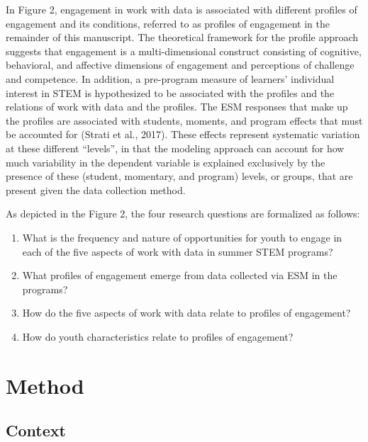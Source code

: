 \documentclass[]{book}
\providecommand{\tightlist}{%
  \setlength{\itemsep}{0pt}\setlength{\parskip}{0pt}}
\theoremstyle{definition}
\theoremstyle{definition}
\theoremstyle{definition}
\theoremstyle{remark}
\begin{document}
In Figure 2, engagement in work with data is associated with different
profiles of engagement and its conditions, referred to as profiles of
engagement in the remainder of this manuscript. The theoretical
framework for the profile approach suggests that engagement is a
multi-dimensional construct consisting of cognitive, behavioral, and
affective dimensions of engagement and perceptions of challenge and
competence. In addition, a pre-program measure of learners' individual
interest in STEM is hypothesized to be associated with the profiles and
the relations of work with data and the profiles. The ESM responses that
make up the profiles are associated with students, moments, and program
effects that must be accounted for (Strati et al., 2017). These effects
represent systematic variation at these different ``levels'', in that
the modeling approach can account for how much variability in the
dependent variable is explained exclusively by the presence of these
(student, momentary, and program) levels, or groups, that are present
given the data collection method.

As depicted in the Figure 2, the four research questions are formalized
as follows:

\begin{enumerate}
\def\labelenumi{\arabic{enumi}.}
\tightlist
\item
  What is the frequency and nature of opportunities for youth to engage
  in each of the five aspects of work with data in summer STEM programs?
\item
  What profiles of engagement emerge from data collected via ESM in the
  programs?
\item
  How do the five aspects of work with data relate to profiles of
  engagement?
\item
  How do youth characteristics relate to profiles of engagement?
\end{enumerate}

\chapter{Method}\label{method}

\section{Context}\label{context}
\end{document}
